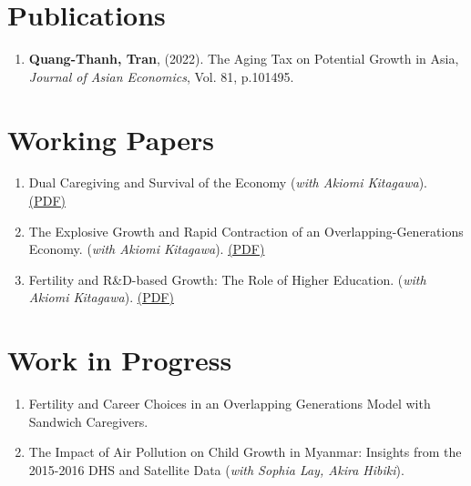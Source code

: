 \section{\sc Publications}
\begin{enumerate}
\item
  {\bf Quang-Thanh, Tran},
  (2022).
  {The Aging Tax on Potential Growth in Asia},
  {\it Journal of Asian Economics}, Vol. 81, p.101495.
\end{enumerate}

\section{\sc Working Papers}
\begin{enumerate}
  \item Dual Caregiving and Survival of the Economy (\textit{with Akiomi Kitagawa}). \href{https://www.dropbox.com/scl/fi/s00pcg0017vtyeb364hlc/main_dualcare-copy.pdf?rlkey=koecpcdaoeroijigjm5x4dtzv&st=6rnfdie5&dl=0}{(PDF)}
  \item The Explosive Growth and Rapid Contraction of an Overlapping-Generations Economy. (\textit{with Akiomi Kitagawa}). \href{https://www.dropbox.com/scl/fi/a7b1vnmypehibjmd2wim4/main_rapidcontraction.pdf?rlkey=t3aoep2iiy7shjmpq9cp6tuz3&st=b5jwqdqg&dl=0}{(PDF)}
  \item Fertility and R\&D-based Growth: The Role of Higher Education. (\textit{with Akiomi Kitagawa}). \href{https://www.dropbox.com/scl/fi/6bkvc2vxrbst1iwocxwdl/main_overedu.pdf?rlkey=v59fcybxfcd105y2ciassjttn&st=ym5ntxq0&dl=0}{(PDF)}
\end{enumerate}

\section{\sc Work in Progress}
\begin{enumerate}
  \item Fertility and Career Choices in an Overlapping Generations Model with Sandwich Caregivers.
  \item The Impact of Air Pollution on Child Growth in Myanmar: Insights from the 2015-2016 DHS and Satellite Data (\textit{with Sophia Lay, Akira Hibiki}).
\end{enumerate}



